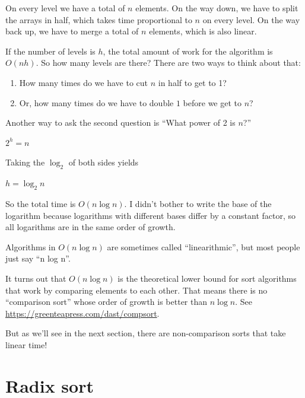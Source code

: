 \documentclass[12pt]{book}
\theoremstyle{exercise}
\begin{document}
On every level we have a total of $n$ elements. On the way down,
we have to split the arrays in half, which takes time proportional to
$n$ on every level. On the way back up, we have to merge a total
of $n$ elements, which is also linear.

If the number of levels is $h$, the total amount of work for the
algorithm is $O(nh)$. So how many levels are there? There are two
ways to think about that:

\begin{enumerate}

\item
  How many times do we have to cut $n$ in half to get to 1?

\item
   Or, how many times do we have to double $1$ before we get to $n$?

\end{enumerate}

Another way to ask the second question is ``What power of 2 is
$n$?''

$2^h = n$

Taking the $\log_2$ of both sides yields

$h = \log_2 n$

So the total time is $O(n \log n)$. I didn't bother to write the
base of the logarithm because logarithms with different bases differ by
a constant factor, so all logarithms are in the same order of growth.


Algorithms in $O(n \log n)$ are sometimes called
``linearithmic'', but most people just say ``n log n''.


It turns out that $O(n \log n)$ is the theoretical lower bound for
sort algorithms that work by comparing elements to each other. That
means there is no ``comparison sort'' whose order of growth is better
than $n \log n$.  See \url{https://greenteapress.com/dast/compsort}.

But as we'll see in the next section, there are non-comparison sorts
that take linear time!



\section{Radix sort}
\label{radix-sort}

\end{document}
